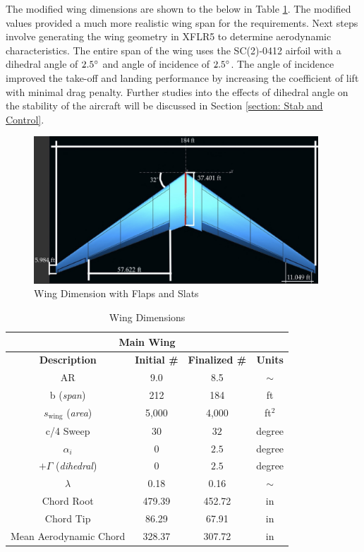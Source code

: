 The modified wing dimensions are shown to the below in Table \ref{tab:wingsizing}.  The modified values provided a much more realistic wing span for the requirements.  Next steps involve generating the wing geometry in XFLR5 to determine aerodynamic characteristics.  The entire span of the wing uses the SC(2)-0412 airfoil with a dihedral angle of $2.5\degree$ and angle of incidence of $2.5 \degree$.  The angle of incidence improved the take-off and landing performance by increasing the coefficient of lift with minimal drag penalty.  Further studies into the effects of dihedral angle on the stability of the aircraft will be discussed in Section \ref{section: Stab and Control}.


\begin{figure}[!h]
    \centering
    \includegraphics[width=0.95\textwidth]{Photos/aero/wing_flapped.png}
    \caption{Wing Dimension with Flaps and Slats}
    \label{fig:winged}
\end{figure}

\begin{table}[!h]
    \centering
    \caption{Wing Dimensions}
    \begin{tabular}{|c|c|c|c|} \toprule
        \multicolumn{4}{c}{\textbf{\textcolor{cobalt}{Main Wing}}} \\ \midrule
        \textbf{Description} & \textbf{Initial \#} & \textbf{Finalized \#} & \textbf{Units} \\ \hline \hline
        AR & 9.0 & 8.5 & $\sim$ \\ \hline
        b (\textit{span}) & 212 & 184 & ft \\ \hline 
        $s_{\text{wing}}$ (\textit{area}) & 5,000 & 4,000 & ft$^2$ \\ \hline
        c/4 Sweep & 30 & $32$ & degree \\ \hline
        $\alpha_i$ & 0 & $2.5$ & degree \\ \hline
        $+\Gamma$ (\textit{dihedral}) & 0 & $2.5$ & degree \\ \hline
        $\lambda$ & 0.18 & 0.16 & $\sim$ \\ \hline
        Chord Root & 479.39 & 452.72 & in \\ \hline
        Chord Tip & 86.29 & 67.91 & in \\ \hline   
        Mean Aerodynamic Chord & 328.37 & 307.72 & in \\ \bottomrule
    \end{tabular}
    \label{tab:wingsizing}
\end{table}
\clearpage

